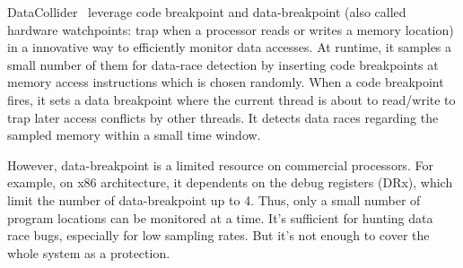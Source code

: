 DataCollider~\cite{erickson2010effective} leverage code breakpoint and data-breakpoint (also called hardware watchpoints: trap when a processor reads or writes a memory location) in a innovative way to efficiently monitor data accesses. At runtime, it samples a small number of them for data-race detection by inserting code breakpoints at memory access instructions which is chosen randomly. When a code breakpoint fires, it sets a data breakpoint where the current thread is about to read/write to trap later access conflicts by other threads. It detects data races regarding the sampled memory within a small time window.

However, data-breakpoint is a limited resource on commercial processors. For example, on x86 architecture, it dependents on the debug registers (DRx), which limit the number of data-breakpoint up to 4. Thus, only a small number of program locations can be monitored at a time. It's sufficient for hunting data race bugs, especially for low sampling rates. But it's not enough to cover the whole system as a protection.
